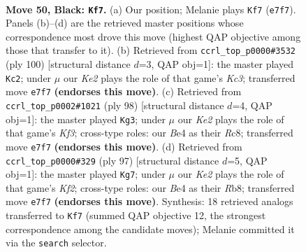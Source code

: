 \documentclass[11pt]{article}
\begin{document}
\clearpage

\begin{figure}[p]\centering
\begin{subfigure}{0.46\textwidth}\centering
\resizebox{\linewidth}{!}{%
\newchessgame
\chessboard[
  setfen={7R/4k3/8/1pp5/4b3/8/8/5K2 b - - 5 50},
  showmover=false,
  pgfstyle=straightmove, color=movearrow, markmove={e7-f7}
]}
\caption{}
\end{subfigure}\hfill
\begin{subfigure}{0.46\textwidth}\centering
\resizebox{\linewidth}{!}{%
\newchessgame
\chessboard[
  setfen={8/7k/1r6/7p/5B1P/2K5/8/8 w - - 0 51},
  showmover=false,
  pgfstyle=straightmove, color=movearrow, markmove={c3-c2}
]}
\caption{}
\end{subfigure}
\\[4pt]
\begin{subfigure}{0.46\textwidth}\centering
\resizebox{\linewidth}{!}{%
\newchessgame
\chessboard[
  setfen={2R5/p7/6k1/8/P7/5K2/8/4r3 w - - 9 50},
  showmover=false,
  pgfstyle=straightmove, color=movearrow, markmove={f3-g3}
]}
\caption{}
\end{subfigure}\hfill
\begin{subfigure}{0.46\textwidth}\centering
\resizebox{\linewidth}{!}{%
\newchessgame
\chessboard[
  setfen={1r6/5k2/3P4/6p1/3K4/8/4R3/8 b - - 0 49},
  showmover=false,
  pgfstyle=straightmove, color=movearrow, markmove={f7-g7}
]}
\caption{}
\end{subfigure}
\caption{\textbf{Move 50, Black: \texttt{Kf7}.} (a) Our position; Melanie plays \texttt{Kf7} (\texttt{e7f7}). Panels (b)--(d) are the retrieved master positions whose correspondence most drove this move (highest QAP objective among those that transfer to it). (b) Retrieved from \texttt{ccrl\_top\_p0000\#3532} (ply 100) [structural distance $d$=3, QAP obj=1]: the master played \texttt{Kc2}; under $\mu$ our \emph{Ke2} plays the role of that game's \emph{Kc3}; transferred move \texttt{e7f7} \textbf{(endorses this move)}. (c) Retrieved from \texttt{ccrl\_top\_p0002\#1021} (ply 98) [structural distance $d$=4, QAP obj=1]: the master played \texttt{Kg3}; under $\mu$ our \emph{Ke2} plays the role of that game's \emph{Kf3}; cross-type roles: our \emph{B}e4 as their \emph{R}c8; transferred move \texttt{e7f7} \textbf{(endorses this move)}. (d) Retrieved from \texttt{ccrl\_top\_p0000\#329} (ply 97) [structural distance $d$=5, QAP obj=1]: the master played \texttt{Kg7}; under $\mu$ our \emph{Ke2} plays the role of that game's \emph{Kf2}; cross-type roles: our \emph{B}e4 as their \emph{R}b8; transferred move \texttt{e7f7} \textbf{(endorses this move)}. Synthesis: 18 retrieved analogs transferred to \texttt{Kf7} (summed QAP objective 12, the strongest correspondence among the candidate moves); Melanie committed it via the \texttt{search} selector.}
\label{fig:thought-m99}
\end{figure}
\end{document}
